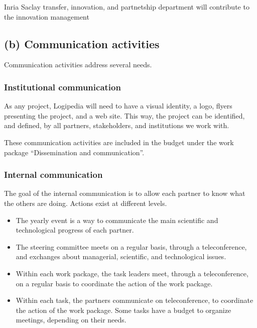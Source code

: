 {\color{red} Inria Saclay transfer, innovation, and partnetship
  department will contribute to the innovation management}


\subsection*{(b) Communication activities}

Communication activities address several needs.

\subsubsection*{Institutional communication}

As any project, Logipedia will need to have a visual identity, a logo,
flyers presenting the project, and a web site.
This way, the project can be identified, and defined, by all partners,
stakeholders, and institutions we work with.

These communication activities are included in the budget under the
work package ``Dissemination and communication''.

\subsubsection*{Internal communication}

The goal of the internal communication is to allow each partner to
know what the others are doing. Actions exist at different levels.

\begin{itemize}
\item The yearly event is a way to communicate the main scientific and
  technological progress of each partner.

\item The steering committee meets on a regular basis, through a
  teleconference, and exchanges about managerial, scientific, and
  technological issues.

\item Within each work package, the task leaders meet, through a
  teleconference, on a regular basis to coordinate the action of the
  work package.

\item Within each task, the partners communicate on teleconference, to
  coordinate the action of the work package. Some tasks have a budget
  to organize meetings, depending on their needs.
\end{itemize}

